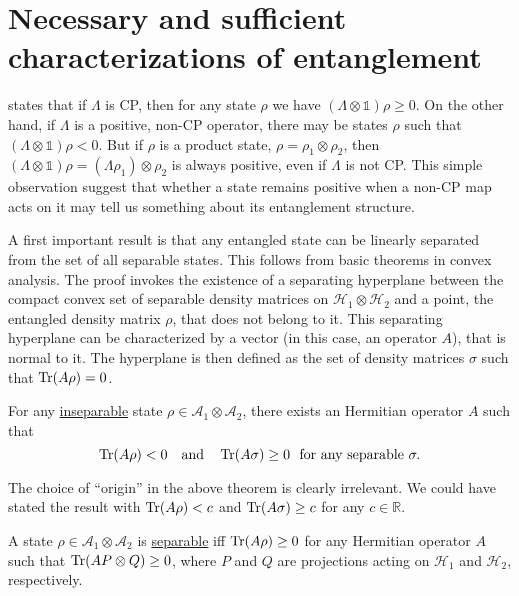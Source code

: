 \documentclass[12pt]{report}
\begin{document}
\section{Necessary and sufficient characterizations of entanglement}
 states that if $\Lambda$ is \ac{CP},
then for any state $\rho$ we have $(\Lambda \otimes \mathds1)\rho \ge 0$.
On the other hand, if $\Lambda$ is a positive, non-\ac{CP} operator, there may be states $\rho$ such that
$(\Lambda \otimes \mathds1)\rho < 0$.
But if $\rho$ is a product state, $\rho = \rho_1 \otimes \rho_2$, then
$(\Lambda \otimes \mathds1)\rho = (\Lambda \rho_1) \otimes \rho_2$ is always positive,
even if $\Lambda$ is not \ac{CP}.
This simple observation suggest that whether a state remains positive when a non-\ac{CP} map acts on it may tell us something about its entanglement structure.

A first important result is that any entangled state can be linearly separated from the set of all separable states.
This follows from basic theorems in convex analysis.
The proof invokes the existence of a separating hyperplane between the compact convex set of separable density matrices on $\mathcal H_1 \otimes \mathcal H_2$ and a point,
the entangled density matrix $\rho$,
that does not belong to it.
This separating hyperplane can be characterized by a vector (in this case, an operator $A$),
that is normal to it.
The hyperplane is then defined as the set of density matrices $\sigma$ such that
$\Tr(A\rho) = 0$.
\begin{thm}
	For any \uline{inseparable} state $\rho \in \mathcal A_1 \otimes \mathcal A_2$,
	there exists an Hermitian operator $A$ such that
	\begin{equation}
		\Tr(A\rho) < 0
		\quad \text{and} \quad
		\Tr(A\sigma) \ge 0
		\,\, \text{ for any separable }\sigma.
	\end{equation}
\end{thm}

\begin{remark}
	The choice of ``origin'' in the above theorem is clearly irrelevant.
	We could have stated the result with $\Tr(A\rho) < c$ and
	$\Tr(A\sigma) \ge c$ for any $c \in \mathbb R$.
\end{remark}

\begin{lemma}
	A state $\rho \in \mathcal A_1 \otimes \mathcal A_2$ is \uline{separable} iff
	$\Tr(A\rho) \ge 0$
	for any Hermitian operator $A$ such that
	$\Tr(A P\otimes Q) \ge 0$, where $P$ and $Q$ are projections acting on
	$\mathcal H_1$ and $\mathcal H_2$, respectively.
	\label{lemma:horodecki96_separable_iff_TrArhoPositive}
\end{lemma}
\end{document}
